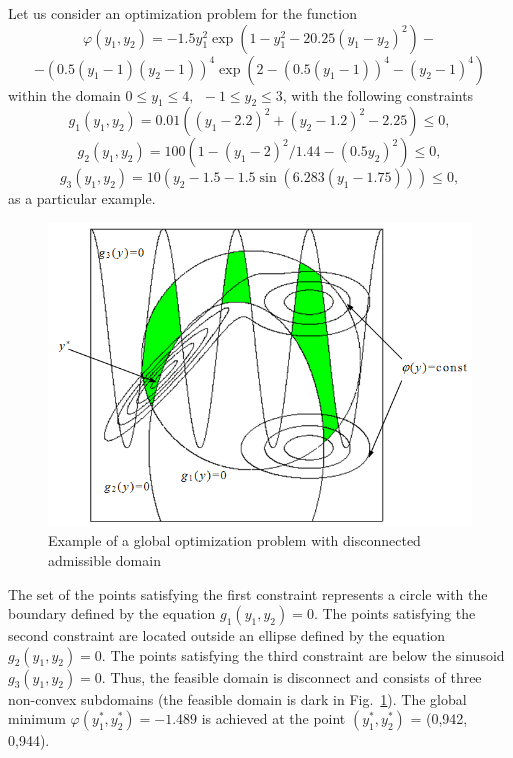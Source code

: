 Let us consider an optimization problem  for the function
\begin{displaymath}
\label{eq:12}
\varphi(y_1,y_2)=-1.5y_1^2\exp(1-y_1^2-20.25(y_1-y_2)^2)-
\end{displaymath}
\begin{displaymath}
\label{eq:12}
-(0.5(y_1-1)(y_2-1))^4\exp(2-(0.5(y_1-1))^4-(y_2-1)^4)
\end{displaymath}
within the domain $0 \leq y_1\leq 4,\ \  -1\leq y_2\leq 3$, with the following constraints 
\begin{displaymath}
g_1(y_1,y_2)=0.01((y_1-2.2)^2+(y_2-1.2)^2-2.25)\leq 0,
\end{displaymath}
\begin{displaymath}
g_2(y_1,y_2)=100(1-(y_1-2)^2/1.44-(0.5y_2)^2)\leq 0,
\end{displaymath}
\begin{displaymath}
g_3(y_1,y_2)=10(y_2-1.5-1.5\sin(6.283(y_1-1.75)))\leq 0,
\end{displaymath}
as a particular example.

\begin{figure}[t]
\includegraphics[width=0.7\linewidth]{figures/figure1_1.png}
\caption{Example of a global optimization problem with disconnected admissible domain}
\label{1_fig_1}    
\end{figure}

The set of the points satisfying the first constraint represents a circle with the boundary defined by the equation $g_1(y_1,y_2)=0$. The points satisfying the second constraint are located outside an ellipse defined by the equation $g_2(y_1,y_2)=0$. The points satisfying the third constraint are below the sinusoid $g_3(y_1,y_2)=0$. Thus, the feasible domain is disconnect and consists of three non-convex subdomains (the feasible domain is dark in Fig.~\ref{1_fig_1}). The global minimum $\varphi(y_1^*,y_2^*)=-1.489$  is achieved at the point $(y_1^*,y_2^*)$  = (0,942, 0,944).

